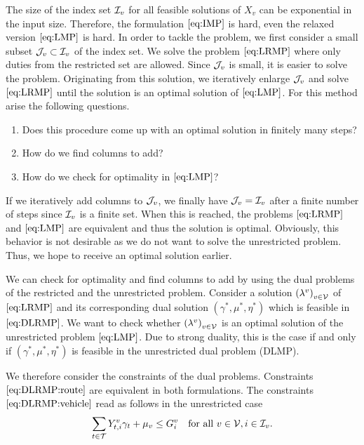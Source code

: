 The size of the index set $\mathcal{I}_v$ for all feasible solutions of $X_v$ can be exponential in the input size. Therefore, the formulation $\eqref{eq:IMP}$ is hard, even the relaxed version $\eqref{eq:LMP}$ is hard. In order to tackle the problem, we first consider a small subset $\mathcal{J}_v\subset\mathcal{I}_v$ of the index set. We solve the problem $\eqref{eq:LRMP}$ where only duties from the restricted set are allowed. Since $\mathcal{J}_v$ is small, it is easier to solve the problem. Originating from this solution, we iteratively enlarge $\mathcal{J}_v$ and solve $\eqref{eq:LRMP}$ until the solution is an optimal solution of $\eqref{eq:LMP}$. For this method arise the following questions.
\begin{enumerate}
	\item{Does this procedure come up with an optimal solution in finitely many steps?}
	\item{How do we find columns to add?}
	\item{How do we check for optimality in $\eqref{eq:LMP}$?}
\end{enumerate}

If we iteratively add columns to $\mathcal{J}_v$, we finally have $\mathcal{J}_v=\mathcal{I}_v$ after a finite number of steps since $\mathcal{I}_v$ is a finite set. When this is reached, the problems $\eqref{eq:LRMP}$ and $\eqref{eq:LMP}$ are equivalent and thus the solution is optimal. Obviously, this behavior is not desirable as we do not want to solve the unrestricted problem. Thus, we hope to receive an optimal solution earlier.

We can check for optimality and find columns to add by using the dual problems of the restricted and the unrestricted problem. Consider a solution $\left(\lambda^v\right)_{v\in\mathcal{V}}$ of $\eqref{eq:LRMP}$ and its corresponding dual solution $\left(\gamma^*,\mu^*,\eta^*\right)$ which is feasible in $\eqref{eq:DLRMP}$. We want to check whether $\left(\lambda^v\right)_{v\in\mathcal{V}}$ is an optimal solution of the unrestricted problem $\eqref{eq:LMP}$. Due to strong duality, this is the case if and only if $\left(\gamma^*,\mu^*,\eta^*\right)$ is feasible in the unrestricted dual problem (DLMP).

We therefore consider the constraints of the dual problems. Constraints $\eqref{eq:DLRMP:route}$ are equivalent in both formulations. The constraints $\eqref{eq:DLRMP:vehicle}$ read as follows in the unrestricted case
\begin{align}
	\sum_{t\in\mathcal{T}} Y^v_{t,i}\gamma_t + \mu_v \leq G^v_i && \text{for all } v\in\mathcal{V},i\in\mathcal{I}_v. \label{eq:DLMP:vehicle}
\end{align}

